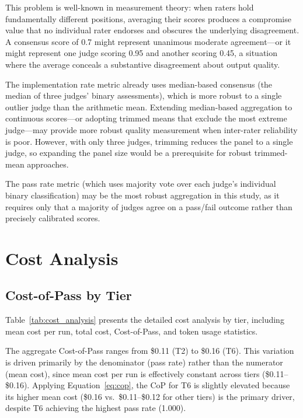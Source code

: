 \documentclass[11pt]{article}
\begin{document}
This problem is well-known in measurement theory: when raters hold
fundamentally different positions, averaging their scores produces a
compromise value that no individual rater endorses and obscures the
underlying disagreement. A consensus score of 0.7 might represent unanimous
moderate agreement---or it might represent one judge scoring 0.95 and
another scoring 0.45, a situation where the average conceals a substantive
disagreement about output quality.

The implementation rate metric already uses median-based consensus (the median
of three judges' binary assessments), which is more robust to a single
outlier judge than the arithmetic mean. Extending median-based aggregation to
continuous scores---or adopting trimmed means that exclude the most extreme
judge---may provide more robust quality measurement when inter-rater
reliability is poor. However, with only three judges, trimming reduces the
panel to a single judge, so expanding the panel size would be a prerequisite
for robust trimmed-mean approaches.

The pass rate metric (which uses majority vote over each judge's individual
binary classification) may be the most robust aggregation in this study, as
it requires only that a majority of judges agree on a pass/fail outcome
rather than precisely calibrated scores.

\section{Cost Analysis}
\label{sec:cost_analysis}

\subsection{Cost-of-Pass by Tier}
\label{sec:cop_by_tier}

Table~\ref{tab:cost_analysis} presents the detailed cost analysis by tier,
including mean cost per run, total cost, Cost-of-Pass, and token usage
statistics.



The aggregate Cost-of-Pass ranges from \$0.11 (T2) to \$0.16 (T6). This
variation is driven primarily by the denominator (pass rate) rather than the
numerator (mean cost), since mean cost per run is effectively constant across
tiers (\$0.11--\$0.16). Applying Equation~\ref{eq:cop}, the CoP for T6 is
slightly elevated because its higher mean cost (\$0.16 vs.\ \$0.11--\$0.12
for other tiers) is the primary driver, despite T6 achieving the highest
pass rate (1.000).
\end{document}
